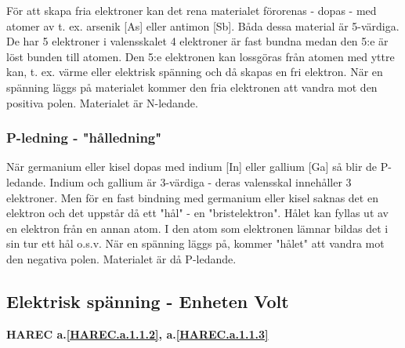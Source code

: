För att skapa fria elektroner kan det rena materialet förorenas - dopas - med
atomer av t. ex. arsenik [As] eller antimon [Sb]. Båda dessa material är
5-värdiga. De har 5 elektroner i valensskalet 4 elektroner är fast bundna medan
den 5:e är löst bunden till atomen. Den 5:e elektronen kan lossgöras från
atomen med yttre kan, t. ex. värme eller elektrisk spänning och då skapas en
fri elektron. När en spänning läggs på materialet kommer den fria elektronen
att vandra mot den positiva polen. Materialet är N-ledande.

\subsubsection{P-ledning - "hålledning"}
När germanium eller kisel dopas med indium [In] eller gallium [Ga] så blir de
P-ledande. Indium och gallium är 3-värdiga - deras valensskal innehåller 3
elektroner. Men för en fast bindning med germanium eller kisel saknas det en
elektron och det uppstår då ett "hål" - en "bristelektron". Hålet kan fyllas ut
av en elektron från en annan atom. I den atom som elektronen lämnar bildas det
i sin tur ett hål o.s.v. När en spänning läggs på, kommer "hålet" att vandra
mot den negativa polen. Materialet är då P-ledande.

\subsection{Elektrisk spänning - Enheten Volt}
\textbf{HAREC a.\ref{HAREC.a.1.1.2}\label{myHAREC.a.1.1.2b}, a.\ref{HAREC.a.1.1.3}\label{myHAREC.a.1.1.3b}}


